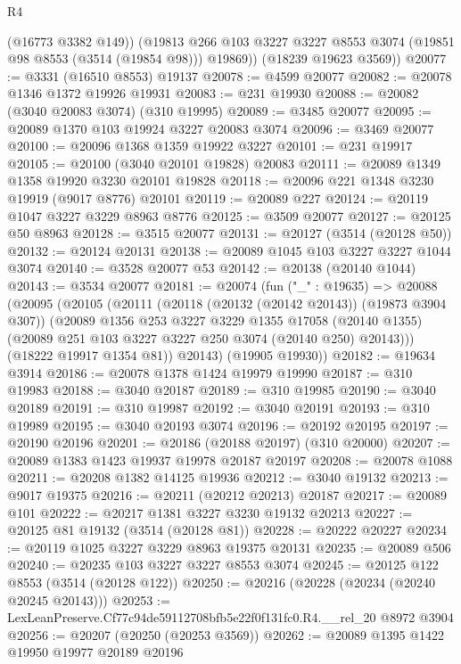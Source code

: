 \begin{lexlean}{R4}
\begin{coremodule}
          (@16773 @3382 @149))
        (@19813 @266 @103 @3227 @3227 @8553 @3074 (@19851 @98 @8553 (@3514 (@19854 @98))) @19869))
      (@18239 @19623 @3569))
@20077 := @3331 (@16510 @8553) @19137
@20078 := @4599 @20077
@20082 := @20078 @1346 @1372 @19926 @19931
@20083 := @231 @19930
@20088 := @20082 (@3040 @20083 @3074) (@310 @19995)
@20089 := @3485 @20077
@20095 := @20089 @1370 @103 @19924 @3227 @20083 @3074
@20096 := @3469 @20077
@20100 := @20096 @1368 @1359 @19922 @3227
@20101 := @231 @19917
@20105 := @20100 (@3040 @20101 @19828) @20083
@20111 := @20089 @1349 @1358 @19920 @3230 @20101 @19828
@20118 := @20096 @221 @1348 @3230 @19919 (@9017 @8776) @20101
@20119 := @20089 @227
@20124 := @20119 @1047 @3227 @3229 @8963 @8776
@20125 := @3509 @20077
@20127 := @20125 @50 @8963
@20128 := @3515 @20077
@20131 := @20127 (@3514 (@20128 @50))
@20132 := @20124 @20131
@20138 := @20089 @1045 @103 @3227 @3227 @1044 @3074
@20140 := @3528 @20077 @53
@20142 := @20138 (@20140 @1044)
@20143 := @3534 @20077
@20181 := @20074
    (fun ("_" : @19635) =>
    @20088
      (@20095
        (@20105
          (@20111
            (@20118 (@20132 (@20142 @20143)) (@19873 @3904 @307))
            (@20089
              @1356
              @253
              @3227
              @3229
              @1355
              @17058
              (@20140 @1355)
              (@20089 @251 @103 @3227 @3227 @250 @3074 (@20140 @250) @20143)))
          (@18222 @19917 @1354 @81))
        @20143)
      (@19905 @19930))
@20182 := @19634 @3914
@20186 := @20078 @1378 @1424 @19979 @19990
@20187 := @310 @19983
@20188 := @3040 @20187
@20189 := @310 @19985
@20190 := @3040 @20189
@20191 := @310 @19987
@20192 := @3040 @20191
@20193 := @310 @19989
@20195 := @3040 @20193 @3074
@20196 := @20192 @20195
@20197 := @20190 @20196
@20201 := @20186 (@20188 @20197) (@310 @20000)
@20207 := @20089 @1383 @1423 @19937 @19978 @20187 @20197
@20208 := @20078 @1088
@20211 := @20208 @1382 @14125 @19936
@20212 := @3040 @19132
@20213 := @9017 @19375
@20216 := @20211 (@20212 @20213) @20187
@20217 := @20089 @101
@20222 := @20217 @1381 @3227 @3230 @19132 @20213
@20227 := @20125 @81 @19132 (@3514 (@20128 @81))
@20228 := @20222 @20227
@20234 := @20119 @1025 @3227 @3229 @8963 @19375 @20131
@20235 := @20089 @506
@20240 := @20235 @103 @3227 @3227 @8553 @3074
@20245 := @20125 @122 @8553 (@3514 (@20128 @122))
@20250 := @20216 (@20228 (@20234 (@20240 @20245 @20143)))
@20253 := LexLeanPreserve.Cf77c94de59112708bfb5e22f0f131fc0.R4.__rel_20 @8972 @3904
@20256 := @20207 (@20250 (@20253 @3569))
@20262 := @20089 @1395 @1422 @19950 @19977 @20189 @20196

\end{coremodule}
\end{lexlean}
